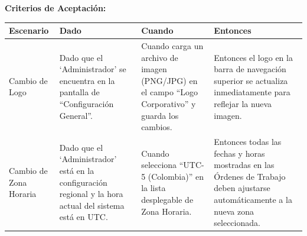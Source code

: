 \noindent
\textbf{Criterios de Aceptación:}
\footnotesize
\begin{longtable}{|p{}|p{}|p{}|p{}|}
\hline
\textbf{Escenario} & \textbf{Dado} & \textbf{Cuando} & \textbf{Entonces} \\ \hline
\endhead
Cambio de Logo & Dado que el `Administrador' se encuentra en la pantalla de ``Configuración General''. & Cuando carga un archivo de imagen (PNG/JPG) en el campo ``Logo Corporativo'' y guarda los cambios. & Entonces el logo en la barra de navegación superior se actualiza inmediatamente para reflejar la nueva imagen. \\ \hline
Cambio de Zona Horaria & Dado que el `Administrador' está en la configuración regional y la hora actual del sistema está en UTC. & Cuando selecciona ``UTC-5 (Colombia)'' en la lista desplegable de Zona Horaria. & Entonces todas las fechas y horas mostradas en las Órdenes de Trabajo deben ajustarse automáticamente a la nueva zona seleccionada. \\ \hline
\end{longtable}
\normalsize
